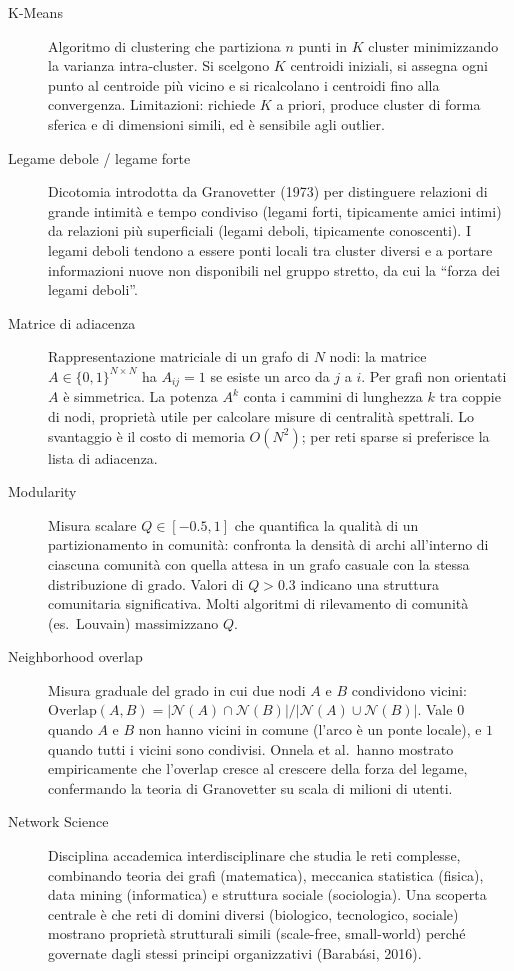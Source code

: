 \documentclass[12pt,a4paper]{article}
\begin{document}
\begin{description}
  \item[K-Means] Algoritmo di clustering che partiziona $n$ punti in $K$ cluster
  minimizzando la varianza intra-cluster. Si scelgono $K$ centroidi iniziali, si
  assegna ogni punto al centroide più vicino e si ricalcolano i centroidi fino alla
  convergenza. Limitazioni: richiede $K$ a priori, produce cluster di forma sferica e
  di dimensioni simili, ed è sensibile agli outlier.

  \item[Legame debole / legame forte] Dicotomia introdotta da Granovetter (1973) per
  distinguere relazioni di grande intimità e tempo condiviso (legami forti, tipicamente
  amici intimi) da relazioni più superficiali (legami deboli, tipicamente conoscenti).
  I legami deboli tendono a essere ponti locali tra cluster diversi e a portare
  informazioni nuove non disponibili nel gruppo stretto, da cui la ``forza dei legami
  deboli''.

  \item[Matrice di adiacenza] Rappresentazione matriciale di un grafo di $N$ nodi: la
  matrice $A \in \{0,1\}^{N\times N}$ ha $A_{ij}=1$ se esiste un arco da $j$ a $i$.
  Per grafi non orientati $A$ è simmetrica. La potenza $A^k$ conta i cammini di
  lunghezza $k$ tra coppie di nodi, proprietà utile per calcolare misure di centralità
  spettrali. Lo svantaggio è il costo di memoria $O(N^2)$; per reti sparse si preferisce
  la lista di adiacenza.

  \item[Modularity] Misura scalare $Q \in [-0.5, 1]$ che quantifica la qualità di un
  partizionamento in comunità: confronta la densità di archi all'interno di ciascuna
  comunità con quella attesa in un grafo casuale con la stessa distribuzione di grado.
  Valori di $Q > 0.3$ indicano una struttura comunitaria significativa. Molti algoritmi
  di rilevamento di comunità (es.\ Louvain) massimizzano $Q$.

  \item[Neighborhood overlap] Misura graduale del grado in cui due nodi $A$ e $B$
  condividono vicini: $\text{Overlap}(A,B) = |\mathcal{N}(A)\cap\mathcal{N}(B)| /
  |\mathcal{N}(A)\cup\mathcal{N}(B)|$. Vale $0$ quando $A$ e $B$ non hanno vicini in
  comune (l'arco è un ponte locale), e $1$ quando tutti i vicini sono condivisi.
  Onnela et al.\ hanno mostrato empiricamente che l'overlap cresce al crescere della
  forza del legame, confermando la teoria di Granovetter su scala di milioni di utenti.

  \item[Network Science] Disciplina accademica interdisciplinare che studia le reti
  complesse, combinando teoria dei grafi (matematica), meccanica statistica (fisica),
  data mining (informatica) e struttura sociale (sociologia). Una scoperta centrale è
  che reti di domini diversi (biologico, tecnologico, sociale) mostrano proprietà
  strutturali simili (scale-free, small-world) perché governate dagli stessi principi
  organizzativi (Barabási, 2016).


\end{description}
\end{document}
